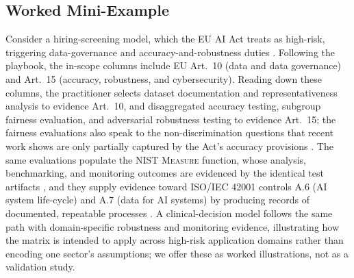\subsection{Worked Mini-Example}
Consider a hiring-screening model, which the EU AI Act treats as high-risk, triggering data-governance and accuracy-and-robustness duties \cite{euaiact2024}. Following the playbook, the in-scope columns include EU Art.~10 (data and data governance) and Art.~15 (accuracy, robustness, and cybersecurity). Reading down these columns, the practitioner selects dataset documentation and representativeness analysis to evidence Art.~10, and disaggregated accuracy testing, subgroup fairness evaluation, and adversarial robustness testing to evidence Art.~15; the fairness evaluations also speak to the non-discrimination questions that recent work shows are only partially captured by the Act's accuracy provisions \cite{meding2025algorithmicdiscrimination}. The same evaluations populate the NIST \textsc{Measure} function, whose analysis, benchmarking, and monitoring outcomes are evidenced by the identical test artifacts \cite{nist2023airmf}, and they supply evidence toward ISO/IEC 42001 controls A.6 (AI system life-cycle) and A.7 (data for AI systems) by producing records of documented, repeatable processes \cite{iso42001}. A clinical-decision model follows the same path with domain-specific robustness and monitoring evidence, illustrating how the matrix is intended to apply across high-risk application domains rather than encoding one sector's assumptions; we offer these as worked illustrations, not as a validation study.

